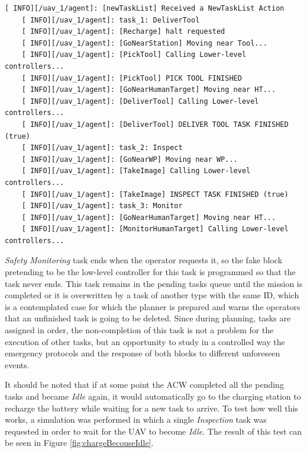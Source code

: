 \begin{lstlisting}[caption={Feedback messages printed by the \emph{Agent Behaviour Manager} during the execution of the whole plan}, breaklines=true, label=exit:firstPlanFeedback]
    [ INFO][/uav_1/agent]: [newTaskList] Received a NewTaskList Action
    [ INFO][/uav_1/agent]: task_1: DeliverTool
    [ INFO][/uav_1/agent]: [Recharge] halt requested
    [ INFO][/uav_1/agent]: [GoNearStation] Moving near Tool...
    [ INFO][/uav_1/agent]: [PickTool] Calling Lower-level controllers...
    [ INFO][/uav_1/agent]: [PickTool] PICK TOOL FINISHED
    [ INFO][/uav_1/agent]: [GoNearHumanTarget] Moving near HT...
    [ INFO][/uav_1/agent]: [DeliverTool] Calling Lower-level controllers...
    [ INFO][/uav_1/agent]: [DeliverTool] DELIVER TOOL TASK FINISHED (true)
    [ INFO][/uav_1/agent]: task_2: Inspect
    [ INFO][/uav_1/agent]: [GoNearWP] Moving near WP...
    [ INFO][/uav_1/agent]: [TakeImage] Calling Lower-level controllers...
    [ INFO][/uav_1/agent]: [TakeImage] INSPECT TASK FINISHED (true)
    [ INFO][/uav_1/agent]: task_3: Monitor
    [ INFO][/uav_1/agent]: [GoNearHumanTarget] Moving near HT...
    [ INFO][/uav_1/agent]: [MonitorHumanTarget] Calling Lower-level controllers...
\end{lstlisting}

\emph{Safety Monitoring} task ends when the operator requests it, so the fake block pretending to be the low-level controller for this task is programmed so that the task never ends. This task remains in the pending tasks queue until the mission is completed or it is overwritten by a task of another type with the same \gls{ID}, which is a contemplated case for which the planner is prepared and warns the operators that an unfinished task is going to be deleted. Since during planning, tasks are assigned in order, the non-completion of this task is not a problem for the execution of other tasks, but an opportunity to study in a controlled way the emergency protocols and the response of both blocks to different unforeseen events.

It should be noted that if at some point the \gls{ACW} completed all the pending tasks and became \emph{Idle} again, it would automatically go to the charging station to recharge the battery while waiting for a new task to arrive. To test how well this works, a simulation was performed in which a single \emph{Inspection} task was requested in order to wait for the \gls{UAV} to become \emph{Idle}. The result of this test can be seen in Figure \ref{fig:chargeBecouseIdle}.

